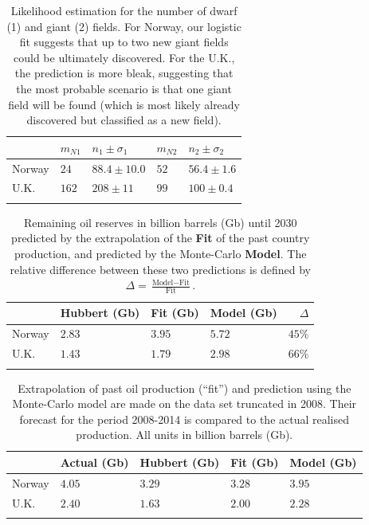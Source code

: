 \documentclass[review]{elsarticle}
\providecommand{\tabularnewline}{\\}
\begin{document}
\begin{table}[h]
\caption{Likelihood estimation for the number of dwarf (1) and giant (2) fields.
For Norway, our logistic fit suggests that up to two new giant fields could be
ultimately discovered. For the U.K., the prediction is more bleak, suggesting
that the most probable scenario is that one giant field will be found (which is most likely already discovered but classified as a new field).}
\centering %
\begin{tabular}{lllll}
 & $m_{N1}$ & $n_{1}\pm\sigma_{1}$ & $m_{N2}$ & $n_{2}\pm\sigma_{2}$\tabularnewline
\midrule Norway  & $24$ & $88.4\pm10.0$ & $52$ & $56.4\pm1.6$\tabularnewline
U.K. & $162$ & $208\pm11$ & $99$ & $100\pm0.4$\tabularnewline
\bottomrule  &  &  &  & \tabularnewline
\end{tabular}\label{likelihood-results}
\end{table}

\pagebreak


\begin{table}[H]
\caption{Remaining oil reserves in billion barrels (Gb) until 2030 predicted by the extrapolation of the  \textbf{Fit} of the past country production, and predicted by the Monte-Carlo \textbf{Model}. The relative difference between these two predictions is defined by $\Delta=\frac{\textrm{Model}-\textrm{Fit}}{\textrm{Fit}}$.}
\centering %
\begin{tabular}{llllr}
 & Hubbert (Gb) & Fit (Gb) & Model (Gb)  & $\Delta$ \tabularnewline
\midrule Norway & $2.83$ & $3.95$ & $5.72$ & $45\%$\tabularnewline
U.K. & $1.43$ & $1.79$  & $2.98$ & $66\%$ \tabularnewline
\bottomrule  &  &  & \tabularnewline
\end{tabular}\label{forecast-14}
\end{table}

\pagebreak


\begin{table}[H]
\caption{Extrapolation of past oil production (``fit'') and prediction
using the Monte-Carlo model are made on the data set truncated
in 2008. Their forecast for the period 2008-2014 is compared to
the actual realised production. All units in billion barrels (Gb).}
\centering %
\begin{tabular}{lllll}
 & Actual (Gb) & Hubbert (Gb) & Fit (Gb) & Model (Gb)\tabularnewline
\midrule Norway & $4.05$  & $3.29$  & $3.28$  & $3.95$ \tabularnewline
U.K. & $2.40$  & $1.63$  & $2.00$  & $2.28$ \tabularnewline
\bottomrule  &  &  & \tabularnewline
\end{tabular}\label{backtest-08}
\end{table}
\end{document}
